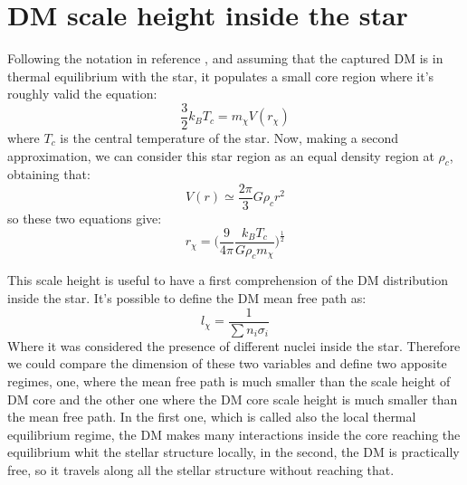 \section{DM scale height inside the star}
\label{App:DM_Scale_height}
Following the notation in reference \cite{SpergelPress_Cond}, and assuming that the captured DM is in thermal equilibrium with the star, it populates a small core region where it's roughly valid the equation:
\begin{equation*}
\frac{3}{2}k_B T_c=m_{\chi}V(r_{\chi})
\end{equation*}
where $T_c$ is the central temperature of the star. Now, making a second approximation, we can consider this star region as an equal density region at $\rho_c$, obtaining that:
\begin{equation*}
    V(r)\simeq \frac{2\pi}{3}G\rho_cr^2
\end{equation*}
so these two equations give:
\begin{equation*}
    r_{\chi}=\Big(\frac{9}{4\pi}\frac{k_BT_c}{G\rho_c m_{\chi}}\Big)^{\frac{1}{2}}
\end{equation*}

This scale height is useful to have a first comprehension of the DM distribution inside the star. It's possible to define the DM mean free path as:
\begin{equation*}
    l_{\chi}=\frac{1}{\sum n_{i}\sigma_{i}}
\end{equation*}
Where it was considered the presence of different nuclei inside the star. Therefore we could compare the dimension of these two variables and define two apposite regimes, one, where the mean free path is much smaller than the scale height of DM core and the other one where the DM core scale height is much smaller than the mean free path. In the first one, which is called also the local thermal equilibrium regime, the DM makes many interactions inside the core reaching the equilibrium whit the stellar structure locally,  in the second, the DM is practically free, so it travels along all the stellar structure without reaching that.